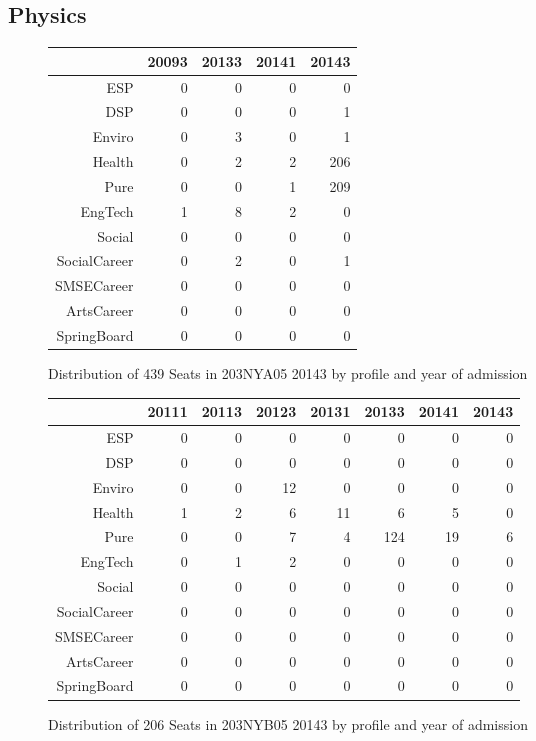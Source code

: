 \documentclass{article}\usepackage[]{graphicx}\usepackage[]{color}
\begin{document}
\subsection{Physics}
\begin{figure}[H]
\centering
\begin{tabular}{rrrrr}
  \hline
 & 20093 & 20133 & 20141 & 20143 \\ 
  \hline
ESP &   0 &   0 &   0 &   0 \\ 
  DSP &   0 &   0 &   0 &   1 \\ 
  Enviro &   0 &   3 &   0 &   1 \\ 
  Health &   0 &   2 &   2 & 206 \\ 
  Pure &   0 &   0 &   1 & 209 \\ 
  EngTech &   1 &   8 &   2 &   0 \\ 
  Social &   0 &   0 &   0 &   0 \\ 
  SocialCareer &   0 &   2 &   0 &   1 \\ 
  SMSECareer &   0 &   0 &   0 &   0 \\ 
  ArtsCareer &   0 &   0 &   0 &   0 \\ 
  SpringBoard &   0 &   0 &   0 &   0 \\ 
   \hline
\end{tabular}
\caption{Distribution of 439 Seats in 203NYA05 20143 by profile and year of admission} 
\end{figure}
\begin{figure}[H]
\centering
\begin{tabular}{rrrrrrrr}
  \hline
 & 20111 & 20113 & 20123 & 20131 & 20133 & 20141 & 20143 \\ 
  \hline
ESP &   0 &   0 &   0 &   0 &   0 &   0 &   0 \\ 
  DSP &   0 &   0 &   0 &   0 &   0 &   0 &   0 \\ 
  Enviro &   0 &   0 &  12 &   0 &   0 &   0 &   0 \\ 
  Health &   1 &   2 &   6 &  11 &   6 &   5 &   0 \\ 
  Pure &   0 &   0 &   7 &   4 & 124 &  19 &   6 \\ 
  EngTech &   0 &   1 &   2 &   0 &   0 &   0 &   0 \\ 
  Social &   0 &   0 &   0 &   0 &   0 &   0 &   0 \\ 
  SocialCareer &   0 &   0 &   0 &   0 &   0 &   0 &   0 \\ 
  SMSECareer &   0 &   0 &   0 &   0 &   0 &   0 &   0 \\ 
  ArtsCareer &   0 &   0 &   0 &   0 &   0 &   0 &   0 \\ 
  SpringBoard &   0 &   0 &   0 &   0 &   0 &   0 &   0 \\ 
   \hline
\end{tabular}
\caption{Distribution of 206 Seats in 203NYB05 20143 by profile and year of admission} 
\end{figure}
\end{document}
